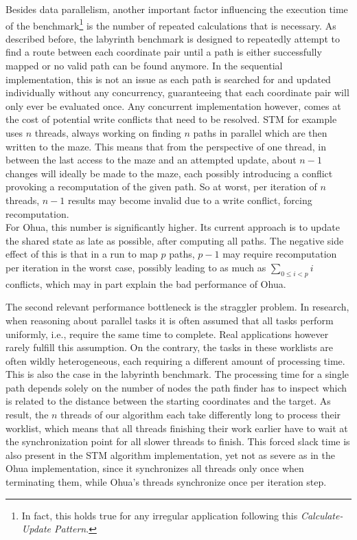 Besides data parallelism, another important factor influencing the execution time of the benchmark\footnote{In fact, this holds true for any irregular application following this \emph{Calculate-Update Pattern}.} is the number of repeated calculations that is necessary.
As described before, the labyrinth benchmark is designed to repeatedly attempt to find a route between each coordinate pair until a path is either successfully mapped or no valid path can be found anymore.
In the sequential implementation, this is not an issue as each path is searched for and updated individually without any concurrency, guaranteeing that each coordinate pair will only ever be evaluated once.
Any concurrent implementation however, comes at the cost of potential write conflicts that need to be resolved.
STM for example uses $n$ threads, always working on finding $n$ paths in parallel which are then written to the maze.
This means that from the perspective of one thread, in between the last access to the maze and an attempted update, about $n - 1$ changes will ideally be made to the maze, each possibly introducing a conflict provoking a recomputation of the given path.
So at worst, per iteration of $n$ threads, $n-1$ results may become invalid due to a write conflict, forcing recomputation.\\
For Ohua, this number is significantly higher.
Its current approach is to update the shared state as late as possible, after computing all paths.
The negative side effect of this is that in a run to map $p$ paths, $p-1$ may require recomputation per iteration in the worst case, possibly leading to as much as $\sum_{0 \leq i < p} i$ conflicts, which may in part explain the bad performance of Ohua.

The second relevant performance bottleneck is the straggler problem.
In research, when reasoning about parallel tasks it is often assumed that all tasks perform uniformly, i.e., require the same time to complete.
Real applications however rarely fulfill this assumption.
On the contrary, the tasks in these worklists are often wildly heterogeneous, each requiring a different amount of processing time.
This is also the case in the labyrinth benchmark.
The processing time for a single path depends solely on the number of nodes the path finder has to inspect which is related to the distance between the starting coordinates and the target.
As result, the $n$ threads of our algorithm each take differently long to process their worklist, which means that all threads finishing their work earlier have to wait at the synchronization point for all slower threads to finish.
This forced slack time is also present in the STM algorithm implementation, yet not as severe as in the Ohua implementation, since it synchronizes all threads only once when terminating them, while Ohua's threads synchronize once per iteration step.


